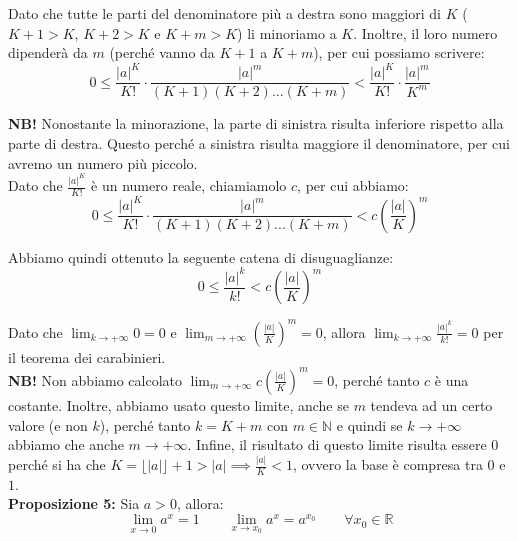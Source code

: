 \documentclass{article}
\begin{document}
\noindent Dato che tutte le parti del denominatore più a destra sono maggiori di $K$ ($K + 1 > K$, $K + 2 > K$ e $K + m > K$) li minoriamo a $K$. Inoltre, il loro numero dipenderà da $m$ (perché vanno da $K + 1$ a $K + m$), per cui possiamo scrivere:
\begin{equation*}
    0 \leq \frac{|a|^K}{K!} \cdot \frac{|a|^m}{(K + 1)(K + 2)...(K + m)} < \frac{|a|^K}{K!} \cdot \frac{|a|^m}{K^m}
\end{equation*}

\noindent\textbf{NB!} Nonostante la minorazione, la parte di sinistra risulta inferiore rispetto alla parte di destra. Questo perché a sinistra risulta maggiore il denominatore, per cui avremo un numero più piccolo.\\

\noindent Dato che $\frac{|a|^K}{K!}$ è un numero reale, chiamiamolo $c$, per cui abbiamo:
\begin{equation*}
    0 \leq \frac{|a|^K}{K!} \cdot \frac{|a|^m}{(K + 1)(K + 2)...(K + m)} < c \left(\frac{|a|}{K}\right)^m
\end{equation*}

\noindent Abbiamo quindi ottenuto la seguente catena di disuguaglianze:
\begin{equation*}
    0 \leq \frac{|a|^k}{k!} < c \left(\frac{|a|}{K}\right)^m
\end{equation*}

\noindent Dato che $\lim_{k \to +\infty} 0 = 0$ e $\lim_{m \to +\infty} (\frac{|a|}{K})^m = 0$, allora $\lim_{k \to +\infty} \frac{|a|^k}{k!} = 0$ per il teorema dei carabinieri.\\

\noindent\textbf{NB!} Non abbiamo calcolato $\lim_{m \to +\infty} c(\frac{|a|}{K})^m = 0$, perché tanto $c$ è una costante. Inoltre, abbiamo usato questo limite, anche se $m$ tendeva ad un certo valore (e non $k$), perché tanto $k = K + m$ con $m \in \mathbb{N}$ e quindi se $k \to +\infty$ abbiamo che anche $m \to +\infty$. Infine, il risultato di questo limite risulta essere $0$ perché si ha che $K = \lfloor |a| \rfloor + 1 > |a| \implies \frac{|a|}{K} < 1$, ovvero la base è compresa tra $0$ e $1$.\\

\noindent\textbf{Proposizione 5:} Sia $a > 0$, allora:
\begin{equation*}
    \lim_{x \to 0} a^x = 1 \qquad \lim_{x \to x_0} a^x = a^{x_0} \qquad \forall x_0 \in \mathbb{R}
\end{equation*}
\end{document}
